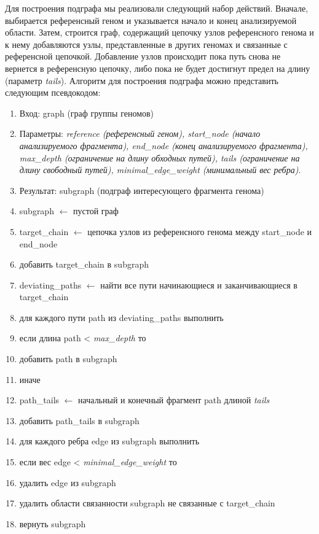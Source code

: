 Для построения подграфа мы реализовали следующий набор действий. Вначале, выбирается референсный геном и указывается начало и конец анализируемой области. Затем, строится граф, содержащий цепочку узлов референсного генома и к нему добавляются узлы, представленные в других геномах и связанные с референсной цепочкой. Добавление узлов происходит пока путь снова не вернется в референсную цепочку, либо пока не будет достигнут предел на длину (параметр \textit{tails}). Алгоритм для построения подграфа можно представить следующим псевдокодом:
\begin{enumerate} 
\item Вход: graph (граф группы геномов)
\item Параметры: \textit{reference (референсный геном), start\_node (начало анализируемого фрагмента), end\_node (конец анализируемого фрагмента), max\_depth (ограничение на длину обходных путей), tails (ограничение на длину свободный путей), minimal\_edge\_weight (минимальный вес ребра)}.
\item Результат: subgraph (подграф интересующего фрагмента генома)
\item subgraph $\leftarrow$ пустой граф
\item target\_chain $\leftarrow$ цепочка узлов из референсного генома между start\_node и end\_node
\item добавить target\_chain в subgraph
\item deviating\_paths $\leftarrow$ найти все пути начинающиеся и заканчивающиеся в target\_chain
\item для каждого пути path из deviating\_paths выполнить
\item если длина path < \textit{max\_depth} то
\item  \quad  добавить path в subgraph
\item иначе
\item \quad path\_tails  $\leftarrow$ начальный и конечный фрагмент path длиной \textit{tails}
\item \quad	добавить path\_tails в subgraph
\item для каждого ребра edge из subgraph выполнить
\item \quad если вес edge < \textit{minimal\_edge\_weight} то
\item \quad \quad удалить edge из subgraph
\item удалить области связанности subgraph не связанные с target\_chain
\item вернуть subgraph
\end{enumerate}


